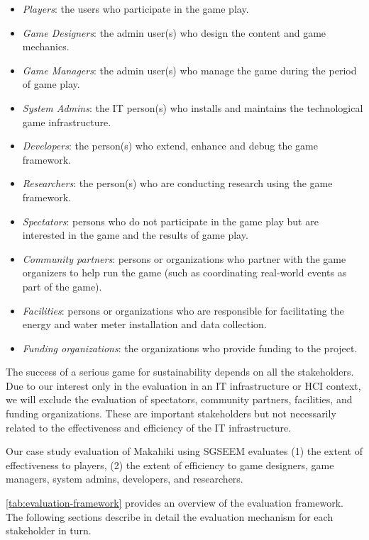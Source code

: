 \documentclass{sigchi}
\begin{document}
\begin{itemize}
\item \emph{Players}: the users who participate in the game play.
\item \emph{Game Designers}: the admin user(s) who design the content
  and game mechanics.
 \item \emph{Game Managers}: the admin user(s) who manage the game
   during the period of game play.
\item \emph{System Admins}: the IT person(s) who installs and maintains
  the technological game infrastructure.
\item \emph{Developers}: the person(s) who extend, enhance and debug
  the game framework.
\item \emph{Researchers}: the person(s) who are conducting research using
  the game framework.
\item \emph{Spectators}: persons who do not participate in the game
  play but are interested in the game and the results of game play.
\item \emph{Community partners}: persons or organizations who partner
  with the game organizers to help run the game (such as coordinating real-world events as part of the game).
\item \emph{Facilities}: persons or organizations who are responsible
  for facilitating the energy and water meter installation and data
  collection.
\item \emph{Funding organizations}: the organizations who provide
  funding to the project.
\end{itemize}

The success of a serious game for sustainability depends on all the
stakeholders. Due to our interest only in the evaluation in an IT
infrastructure or HCI context, we will exclude the evaluation of
spectators, community partners, facilities, and funding organizations.
These are important stakeholders but not necessarily related to the
effectiveness and efficiency of the IT infrastructure.

Our case study evaluation of Makahiki using SGSEEM evaluates (1) the
extent of effectiveness to players, (2) the extent of efficiency to
game designers, game managers, system admins, developers, and
researchers.

\autoref{tab:evaluation-framework} provides an overview of the
evaluation framework. The following sections describe in detail the
evaluation mechanism for each stakeholder in turn.
\end{document}
